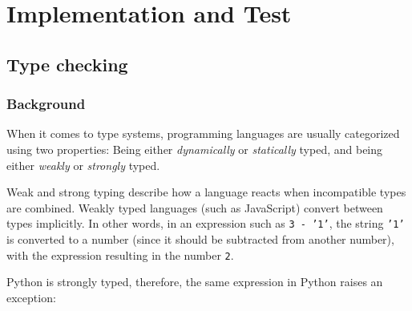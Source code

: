 \documentclass[a4paper,parskip=full]{scrreprt}
\newcommand{\js}[1]{\texttt{#1}}
\begin{document}
% 
% 
% 
% 

\chapter{Implementation and Test}
\label{ch:implementation}

\section{Type checking}
\subsection{Background}
When it comes to type systems, programming languages are usually categorized
using two properties: Being either \emph{dynamically} or \emph{statically}
typed, and being either \emph{weakly} or \emph{strongly} typed.

Weak and strong typing describe how a language reacts when incompatible types
are combined. Weakly typed languages (such as JavaScript) convert between types
implicitly. In other words, in an expression such as
\js{3 - '1'}, the string \js{'1'} is converted to a number (since it should be
subtracted from another number), with the expression resulting in the number
\js{2}.

Python is strongly typed, therefore, the same expression in Python raises an
exception:
\end{document}
